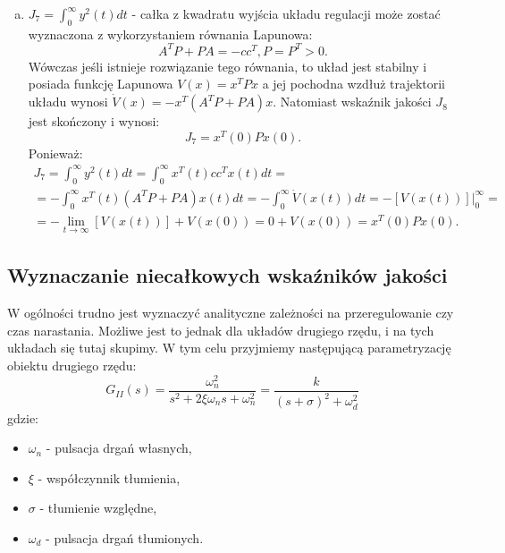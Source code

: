 \documentclass{article}
\begin{document}
\begin{enumerate}[(a)]
        \item $J_{7} = \int_{0}^{\infty}{y^{2}(t)dt}$ - całka z kwadratu wyjścia
        układu regulacji może zostać wyznaczona z wykorzystaniem równania
        Lapunowa:
        $$
            A^{T}P + PA = -cc^{T}, P = P^{T} > 0.
        $$
        Wówczas jeśli istnieje rozwiązanie tego równania, to układ jest stabilny
        i posiada funkcję Lapunowa 
        $V(x) = x^{T}Px$ a jej pochodna wzdłuż trajektorii układu wynosi
        $\dot{V}(x) = -x^{T}\left(A^{T}P + PA\right)x$.
        Natomiast wskaźnik jakości $J_{8}$ jest skończony i wynosi:
        $$
            J_{7} = x^{T}(0)Px(0).
        $$
        Ponieważ:
        $$
        \begin{array}{c}
        J_{7} = \int_{0}^{\infty}{y^{2}(t)dt} = \int_{0}^{\infty}{x^{T}(t)cc^{T}x(t)dt} = \\
        
        = -\int_{0}^{\infty}{x^{T}(t)\left(A^{T}P + PA\right)x(t)dt} = -\int_{0}^{\infty}{\dot{V}(x(t))dt} = -\left[ V(x(t)) \right]|_{0}^{\infty} = \\

        = -\lim_{t\rightarrow \infty} \left[V(x(t))\right] + V(x(0)) = 0 + V(x(0)) = x^{T}(0)Px(0).


        \end{array}
        $$
    \end{enumerate}
    \subsection{Wyznaczanie niecałkowych wskaźników jakości}
    W ogólności trudno jest wyznaczyć analityczne zależności na przeregulowanie czy czas narastania.
    Możliwe jest to jednak dla układów drugiego rzędu, i na tych układach się tutaj skupimy.
    W tym celu przyjmiemy następującą parametryzację obiektu drugiego rzędu:
    $$
        G_{II}(s) = \frac{\omega_{n}^{2}}{s^{2} + 2\xi\omega_{n}s + \omega_{n}^{2}} = \frac{k}{(s+\sigma)^{2} + \omega_{d}^{2}}
    $$
    gdzie:
    \begin{itemize}
        \item $\omega_{n}$ - pulsacja drgań własnych,
        \item $\xi$ - współczynnik tłumienia,
        \item $\sigma$ - tłumienie względne,
        \item $\omega_{d}$ - pulsacja drgań tłumionych.
    \end{itemize}
\end{document}
